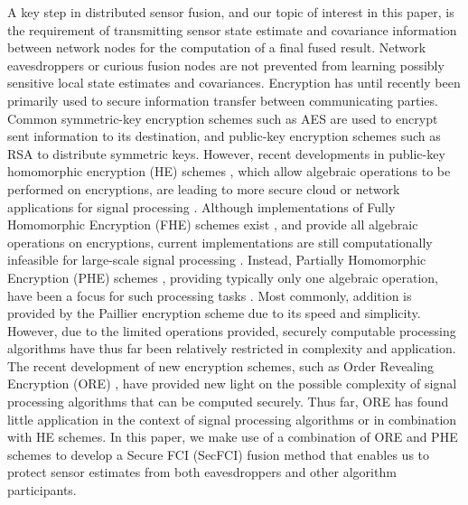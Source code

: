 \documentclass[letterpaper, 10 pt, conference]{ieeeconf}  %
\begin{document}
A key step in distributed sensor fusion, and our topic of interest in this paper, is the requirement of transmitting sensor state estimate and covariance information between network nodes for the computation of a final fused result. Network eavesdroppers or curious fusion nodes are not prevented from learning possibly sensitive local state estimates and covariances. Encryption has until recently been primarily used to secure information transfer between communicating parties. Common symmetric-key encryption schemes such as AES \cite{daemonAnnouncingAdvancedEncryption2001} are used to encrypt sent information to its destination, and public-key encryption schemes such as RSA \cite{rivestMethodObtainingDigital1978} to distribute symmetric keys. However, recent developments in public-key homomorphic encryption (HE) schemes \cite{gentryFullyHomomorphicEncryption2009,elgamalPublicKeyCryptosystem1985,paillierPublicKeyCryptosystemsBased1999}, which allow algebraic operations to be performed on encryptions, are leading to more secure cloud or network applications for signal processing \cite{lagendijkEncryptedSignalProcessing2012,alexandruEncryptedCooperativeControl2019,aristovEncryptedMultisensorInformation2018}. Although implementations of Fully Homomorphic Encryption (FHE) schemes exist \cite{gentryImplementingGentryFullyHomomorphic2011}, and provide all algebraic operations on encryptions, current implementations are still computationally infeasible for large-scale signal processing \cite{duImplementingMLAlgorithms2017,acarSurveyHomomorphicEncryption2018}. Instead, Partially Homomorphic Encryption (PHE) schemes \cite{elgamalPublicKeyCryptosystem1985,paillierPublicKeyCryptosystemsBased1999}, providing typically only one algebraic operation, have been a focus for such processing tasks \cite{alexandruEncryptedCooperativeControl2019,aristovEncryptedMultisensorInformation2018}. Most commonly, addition is provided by the Paillier encryption scheme \cite{paillierPublicKeyCryptosystemsBased1999} due to its speed and simplicity. However, due to the limited operations provided, securely computable processing algorithms have thus far been relatively restricted in complexity and application. The recent development of new encryption schemes, such as Order Revealing Encryption (ORE) \cite{chenettePracticalOrderRevealingEncryption2016,lewiOrderRevealingEncryptionNew2016,bogatovComparativeEvaluationOrderPreserving2018}, have provided new light on the possible complexity of signal processing algorithms that can be computed securely. Thus far, ORE has found little application in the context of signal processing algorithms or in combination with HE schemes. In this paper, we make use of a combination of ORE and PHE schemes to develop a Secure FCI (SecFCI) fusion method that enables us to protect sensor estimates from both eavesdroppers and other algorithm participants.
\end{document}
